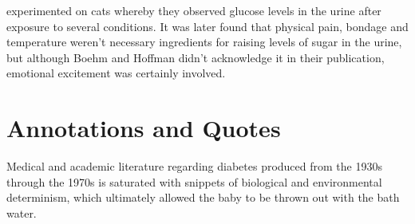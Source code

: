 \documentclass[12pt]{article}
\begin{document}
\citet{boehm_1878_beitrage} experimented on cats whereby they observed glucose levels in the urine after exposure to several conditions. It was later found that physical pain, bondage and temperature weren't necessary ingredients for raising levels of sugar in the urine, but although Boehm and Hoffman didn't acknowledge it in their publication, emotional excitement was certainly involved.  

\section{Annotations and Quotes}

Medical and academic literature regarding diabetes produced from the 1930s through the 1970s is saturated with snippets of biological and environmental determinism, which ultimately allowed the baby to be thrown out with the bath water.  
\end{document}
